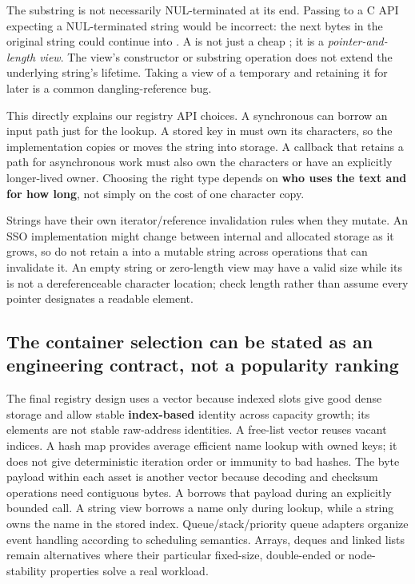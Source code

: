 The substring is not necessarily NUL-terminated at its end. Passing  to a C API expecting a NUL-terminated string would be incorrect: the next bytes in the original string could continue into . A  is not just a cheap ; it is a \emph{pointer-and-length view}. The view's constructor or substring operation does not extend the underlying string's lifetime. Taking a view of a temporary  and retaining it for later is a common dangling-reference bug.

This directly explains our registry API choices. A synchronous  can borrow an input path just for the lookup. A stored key in  must own its characters, so the implementation copies or moves the string into  storage. A callback that retains a path for asynchronous work must also own the characters or have an explicitly longer-lived owner. Choosing the right type depends on \textbf{who uses the text and for how long}, not simply on the cost of one character copy.

Strings have their own iterator/reference invalidation rules when they mutate. An SSO implementation might change between internal and allocated storage as it grows, so do not retain a  into a mutable string across operations that can invalidate it. An empty string or zero-length view may have a valid size while its  is not a dereferenceable character location; check length rather than assume every pointer designates a readable element.

\subsection{The container selection can be stated as an engineering contract, not a popularity ranking}\label{05-engine-i-ch005-the-container-selection-can-be-stated-as-an-engineering-contract-not-a-popularity-ranking}

\hypertarget{05-engine-i-ch005-the-container-selection-can-be-stated-as-an-engineering-contract-not-a-popularity-ranking}{}

The final registry design uses a vector because indexed slots give good dense storage and allow stable \textbf{index-based} identity across capacity growth; its elements are not stable raw-address identities. A free-list vector reuses vacant indices. A hash map provides average efficient name lookup with owned keys; it does not give deterministic iteration order or immunity to bad hashes. The byte payload within each asset is another vector because decoding and checksum operations need contiguous bytes. A  borrows that payload during an explicitly bounded call. A string view borrows a name only during lookup, while a string owns the name in the stored index. Queue/stack/priority queue adapters organize event handling according to scheduling semantics. Arrays, deques and linked lists remain alternatives where their particular fixed-size, double-ended or node-stability properties solve a real workload.

